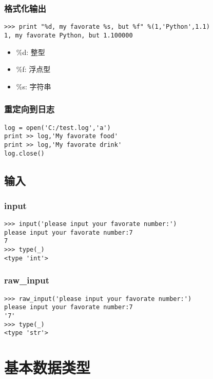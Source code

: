 \documentclass[13pt]{beamer}
\begin{document}
\begin{frame}[containsverbatim]
\frametitle{格式化输出}
\begin{lstlisting}
>>> print "%d, my favorate %s, but %f" %(1,'Python',1.1)
1, my favorate Python, but 1.100000
\end{lstlisting}
\begin{itemize}
  \item \%d: 整型
  \item \%f: 浮点型
  \item \%s: 字符串
\end{itemize}
\end{frame}

\begin{frame}[containsverbatim]
\frametitle{重定向到日志}
\begin{lstlisting}
log = open('C:/test.log','a')
print >> log,'My favorate food'
print >> log,'My favorate drink'
log.close()
\end{lstlisting}
\end{frame}

\subsection{输入}
\begin{frame}[containsverbatim]
\frametitle{input}
\begin{lstlisting}
>>> input('please input your favorate number:')
please input your favorate number:7
7
>>> type(_)
<type 'int'>
\end{lstlisting}
\end{frame}

\begin{frame}[containsverbatim]
\frametitle{raw\_input}
\begin{lstlisting}
>>> raw_input('please input your favorate number:')
please input your favorate number:7
'7'
>>> type(_)
<type 'str'>
\end{lstlisting}
\end{frame}

\section{基本数据类型}
\end{document}
